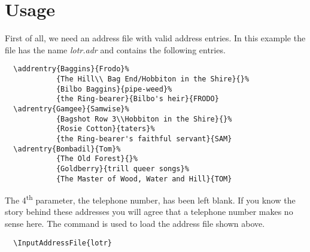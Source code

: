 \section{Usage}\label{sec:scraddr.usage}

First of all, we need an address file with valid address entries.
In this example the file has the name \emph{lotr.adr} and contains
the following entries.
\begin{lstlisting}
  \addrentry{Baggins}{Frodo}%
            {The Hill\\ Bag End/Hobbiton in the Shire}{}%
            {Bilbo Baggins}{pipe-weed}%
            {the Ring-bearer}{Bilbo's heir}{FRODO}
  \adrentry{Gamgee}{Samwise}%
            {Bagshot Row 3\\Hobbiton in the Shire}{}%
            {Rosie Cotton}{taters}%
            {the Ring-bearer's faithful servant}{SAM}
  \adrentry{Bombadil}{Tom}%
            {The Old Forest}{}%
            {Goldberry}{trill queer songs}%
            {The Master of Wood, Water and Hill}{TOM}
\end{lstlisting}

The 4\textsuperscript{th} parameter, the telephone number, has been left
blank. If you know the story behind these addresses you
will agree that a telephone number makes no sense here.
The command  is used to load
the address file shown above.
\begin{lstlisting}
  \InputAddressFile{lotr}
\end{lstlisting}


